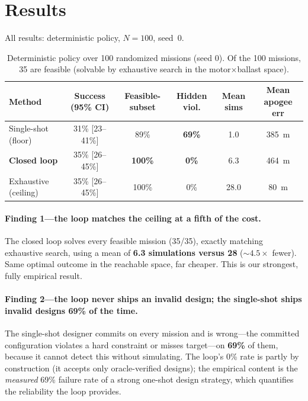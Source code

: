 \documentclass[11pt]{article}
\begin{document}
\section{Results}

All results: deterministic policy, $N = 100$, seed~0.

\begin{table}[h]
\centering
\small
\begin{tabular}{lccccc}
\toprule
Method & Success (95\% CI) & Feasible-subset & Hidden viol. & Mean sims & Mean apogee err \\
\midrule
Single-shot (floor)   & 31\% [23--41\%] & 89\%  & \textbf{69\%} & 1.0  & 385~m \\
\textbf{Closed loop}  & 35\% [26--45\%] & \textbf{100\%} & \textbf{0\%}  & 6.3  & 464~m \\
Exhaustive (ceiling)  & 35\% [26--45\%] & 100\% & 0\%  & 28.0 & 80~m  \\
\bottomrule
\end{tabular}
\caption{Deterministic policy over 100 randomized missions (seed 0). Of the 100
missions, 35 are feasible (solvable by exhaustive search in the
motor$\times$ballast space).}
\label{tab:results}
\end{table}

\paragraph{Finding 1---the loop matches the ceiling at a fifth of the cost.} The
closed loop solves every feasible mission (35/35), exactly matching exhaustive
search, using a mean of \textbf{6.3 simulations versus 28} (${\sim}4.5\times$
fewer). Same optimal outcome in the reachable space, far cheaper. This is our
strongest, fully empirical result.

\paragraph{Finding 2---the loop never ships an invalid design; the single-shot
ships invalid designs 69\% of the time.} The single-shot designer commits on
every mission and is wrong---the committed configuration violates a hard
constraint or misses target---on \textbf{69\%} of them, because it cannot detect
this without simulating. The loop's 0\% rate is partly by construction (it
accepts only oracle-verified designs); the empirical content is the
\emph{measured} 69\% failure rate of a strong one-shot design strategy, which
quantifies the reliability the loop provides.
\end{document}
